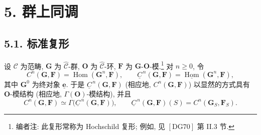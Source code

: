 
\section*{5. 群上同调}

\subsection*{5.1. 标准复形}

设 \(\mathscr C\) 为范畴, \(\mathbf G\) 为
\(\widehat{\mathscr C}\)-群, \(\mathbf O\) 为
\(\widehat{\mathscr C}\)-环, \(\mathbf F\) 为
\(\mathbf G\)-\(\mathbf O\)-模.\footnote{编者注: 此复形常称为 Hochschild 复形; 例如, 见
\([\mathrm{DG}70]\) 第 II.3 节.} 对 \(n\geq 0\), 令
\[
  C^n(\mathbf G,\mathbf F)
    =\operatorname{Hom}(\mathbf G^n,\mathbf F),
  \qquad
  \underline C^{\,n}(\mathbf G,\mathbf F)
    =\underline{\operatorname{Hom}}(\mathbf G^n,\mathbf F),
\]
其中 \(\mathbf G^0\) 为终对象 \(\underline{\mathbf e}\).
于是 \(\underline C^{\,n}(\mathbf G,\mathbf F)\) (相应地,
\(C^n(\mathbf G,\mathbf F)\)) 以显然的方式具有
\(\mathbf O\)-模结构 (相应地,
\(\Gamma(\mathbf O)\)-模结构), 并且
\[
  C^n(\mathbf G,\mathbf F)
    \simeq \Gamma\bigl(\underline C^{\,n}(\mathbf G,\mathbf F)\bigr),
  \qquad
  \underline C^{\,n}(\mathbf G,\mathbf F)(S)
    =C^n(\mathbf G_S,\mathbf F_S).
\]

